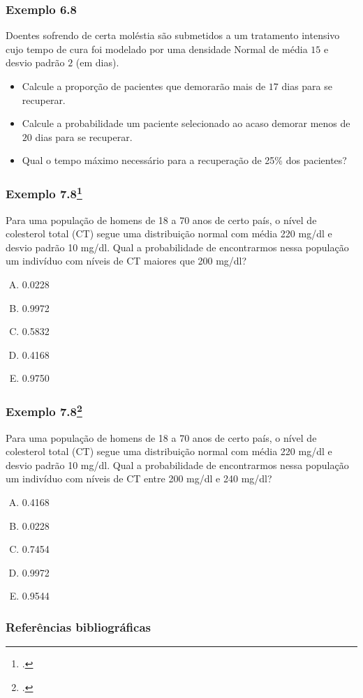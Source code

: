 \documentclass[11pt]{beamer}
\begin{document}
\begin{frame}
\frametitle{Exemplo 6.8}

Doentes sofrendo de certa moléstia são submetidos a um tratamento
intensivo cujo tempo de cura foi modelado por uma densidade Normal de
média \(15\) e desvio padrão \(2\) (em dias).

\begin{itemize}
\item
  Calcule a proporção de pacientes que demorarão mais de \(17\) dias
  para se recuperar.
\item
  Calcule a probabilidade um paciente selecionado ao acaso demorar menos
  de \(20\) dias para se recuperar.
\item
  Qual o tempo máximo necessário para a recuperação de 25\% dos
  pacientes?

\end{itemize}
\end{frame}

\begin{frame}
\frametitle{Exemplo 7.8\footcite{martinez2015bioestatistica}}

Para uma população de homens de 18 a 70 anos de certo país, o nível de colesterol total (CT) segue uma distribuição normal com média 220 mg/dl e desvio padrão 10 mg/dl. Qual a probabilidade de encontrarmos nessa população um indivíduo com níveis de CT maiores que 200 mg/dl?

\begin{enumerate}[A)]
\item 0.0228
\item 0.9972
\item 0.5832
\item 0.4168
\item 0.9750
\end{enumerate}
\end{frame}

\begin{frame}
\frametitle{Exemplo 7.8\footcite{martinez2015bioestatistica}}

Para uma população de homens de 18 a 70 anos de certo país, o nível de colesterol total (CT) segue uma distribuição normal com média 220 mg/dl e desvio padrão 10 mg/dl. Qual a probabilidade de encontrarmos nessa população um indivíduo com níveis de CT entre 200 mg/dl e 240 mg/dl?

\begin{enumerate}[A)]
\item 0.4168
\item 0.0228
\item 0.7454
\item 0.9972
\item 0.9544
\end{enumerate}
\end{frame}

\begin{frame}
\frametitle{Referências bibliográficas}
\printbibliography
\end{frame}
\end{document}
